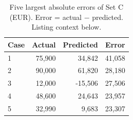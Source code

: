 \begin{table}[h!]
\centering\small\setlength{\tabcolsep}{3pt}
\begin{tabular}{lrrr}
\toprule
Case & Actual & Predicted & Error\\
\midrule
1 & 75,900 & 34,842 & 41,058\\
2 & 90,000 & 61,820 & 28,180\\
3 & 12,000 & -15,506 & 27,506\\
4 & 48,600 & 24,643 & 23,957\\
5 & 32,990 & 9,683 & 23,307\\
\bottomrule
\end{tabular}
\caption{Five largest absolute errors of Set C (EUR). Error = actual $-$ predicted. Listing context below.}
\label{tab:cases}
\end{table}
